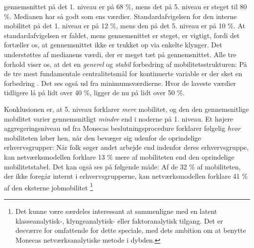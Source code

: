 gennemsnittet på det 1. niveau er på 68 \%, mens det på 5. niveau er steget til 80 \%. Medianen har så godt som ens værdier. Standardafvigelsen for den interne mobilitet på det 1. niveau er på 12 \%, mens den på det 5. niveau er på 10 \%. At standardafvigelsen er faldet, mens gennemsnittet er steget, er vigtigt, fordi det fortæller os, at gennemsnittet ikke er trukket op via enkelte klynger. Det understøttes af medianens værdi, der er meget tæt på gennemsnittet. Alle tre forhold viser os, at det en \emph{generel} og \emph{stabil} forbedring af mobilitetsstrukturen: På de tre mest fundamentale centralitetsmål for kontinuerte variable er der sket en forbedring \parencite[121]{Malchow-MoellerWuertz2010}. Det ses også ud fra minimumsværdierne. Hvor de laveste værdier tidligere lå på lidt over 40 \%, ligger de nu på lidt over 50 \%.


Konklusionen er, at 5. niveau forklarer \emph{mere} mobilitet, og den den gennemsnitlige mobilitet varier gennemsnitligt \emph{mindre} end i noderne på 1. niveau. Et højere aggregeringsniveau ud fra Monecas beslutningsprocedure forklarer følgelig \emph{hvor} mobiliteten løber hen, når den bevæger sig udenfor de oprindelige erhvervsgrupper: Når folk søger andet arbejde end indenfor deres erhvervsgruppe, kan netværksmodellen forklare 13 \% mere af mobiliteten end den oprindelige mobilitetstabel. Det kan også ses på følgende måde: Af de 32 \% af mobiliteten, der ikke foregår internt i erhvervsgrupperne, kan netværksmodellen forklare 41 \% af den eksterne jobmobilitet%
%
\footnote{ Det kunne være særdeles interessant at sammenligne med en latent klasseanalytisk-, klyngeanalytisk- eller faktoranalytisk tilgang. Det er desværre for omfattende for dette speciale, med dets ambition om at benytte Monecas netværksanalytiske metode i dybden.}
%



